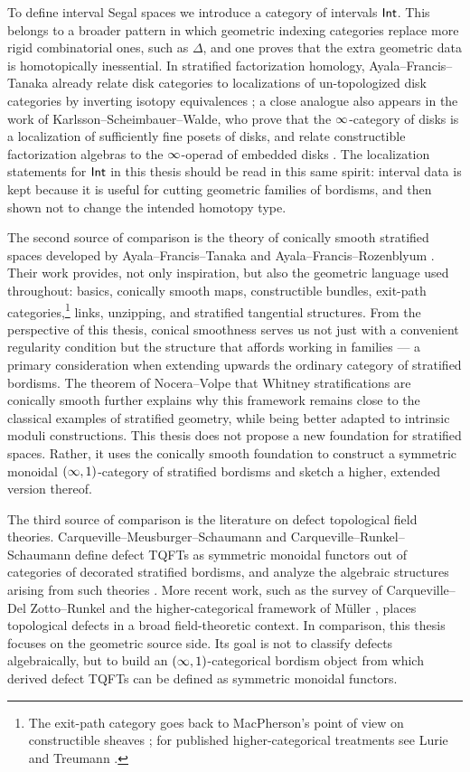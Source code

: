 To define interval Segal spaces we introduce a category of intervals $\operatorname{\mathsf{Int}}$. This belongs to a broader pattern in which geometric indexing categories replace more rigid combinatorial ones, such as $\Delta$, and one proves that the extra geometric data is homotopically inessential. In stratified factorization homology, Ayala--Francis--Tanaka already relate disk categories to localizations of un-topologized disk categories by inverting isotopy equivalences \cite{AF3}; a close analogue also appears in the work of Karlsson--Scheimbauer--Walde, who prove that the $\operatorname{\infty}$-category of disks is a localization of sufficiently fine posets of disks, and relate constructible factorization algebras to the $\operatorname{\infty}$-operad of embedded disks \cite{KSW25}. The localization statements for $\operatorname{\mathsf{Int}}$ in this thesis should be read in this same spirit: interval data is kept because it is useful for cutting geometric families of bordisms, and then shown not to change the intended homotopy type.

The second source of comparison is the theory of conically smooth stratified spaces developed by Ayala--Francis--Tanaka and Ayala--Francis--Rozenblyum \cite{AFT1,AFR1,AFR2}. Their work provides, not only inspiration, but also the geometric language used throughout: basics, conically smooth maps, constructible bundles, exit-path categories,\footnote{The exit-path category goes back to MacPherson's point of view on constructible sheaves \cite{Mac91}; for published higher-categorical treatments see Lurie \cite{LurieHA} and Treumann \cite{Tre09}.} links, unzipping, and stratified tangential structures. From the perspective of this thesis, conical smoothness serves us not just with a convenient regularity condition but the structure that affords working in families — a primary consideration when extending upwards the ordinary category of stratified bordisms. The theorem of Nocera--Volpe that Whitney stratifications are conically smooth \cite{NV23} further explains why this framework remains close to the classical examples of stratified geometry, while being better adapted to intrinsic moduli constructions. This thesis does not propose a new foundation for stratified spaces. Rather, it uses the conically smooth foundation to construct a symmetric monoidal $(\operatorname{\infty},1)$-category of stratified bordisms and sketch a higher, extended version thereof.

The third source of comparison is the literature on defect topological field theories. Carqueville--Meusburger--Schaumann and Carqueville--Runkel--Schaumann define defect TQFTs as symmetric monoidal functors out of categories of decorated stratified bordisms, and analyze the algebraic structures arising from such theories \cite{CMS20,CRS19}. More recent work, such as the survey of Carqueville--Del Zotto--Runkel \cite{CZR25} and the higher-categorical framework of Müller \cite{Mu25}, places topological defects in a broad field-theoretic context. In comparison, this thesis focuses on the geometric source side. Its goal is not to classify defects algebraically, but to build an $(\operatorname{\infty},1)$-categorical bordism object from which derived defect TQFTs can be defined as symmetric monoidal functors.

